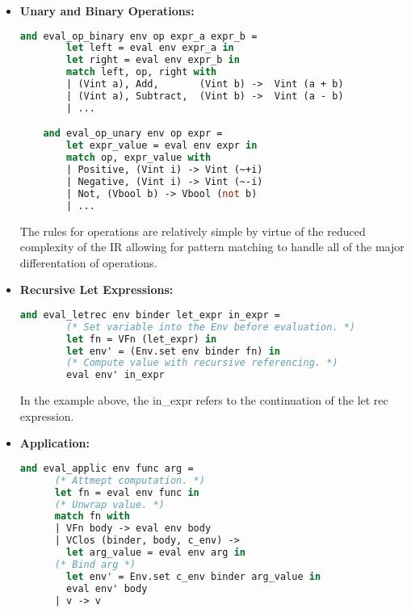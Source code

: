 \documentclass{l4proj}
\begin{document}
\begin{itemize}
    \item \textbf{Unary and Binary Operations:}
    
    \begin{lstlisting}[language=Caml, caption=Excerpt of the PyFunc Interpreter rules for binary and unary operations.]
    and eval_op_binary env op expr_a expr_b =
        let left = eval env expr_a in
        let right = eval env expr_b in
        match left, op, right with
        | (Vint a), Add,       (Vint b) ->  Vint (a + b)
        | (Vint a), Subtract,  (Vint b) ->  Vint (a - b)
        | ...

    and eval_op_unary env op expr = 
        let expr_value = eval env expr in
        match op, expr_value with
        | Positive, (Vint i) -> Vint (~+i)
        | Negative, (Vint i) -> Vint (~-i)
        | Not, (Vbool b) -> Vbool (not b)
        | ...
    \end{lstlisting}
    The rules for operations are relatively simple by virtue of the reduced complexity of the IR allowing for pattern matching to handle all of the major differentation of operations.

    \item \textbf{Recursive Let Expressions:}
    \begin{lstlisting}[language=Caml, caption=The Pyfunc Interpreter let rec rule.]
    and eval_letrec env binder let_expr in_expr =
        (* Set variable into the Env before evaluation. *)
        let fn = VFn (let_expr) in
        let env' = (Env.set env binder fn) in
        (* Compute value with recursive referencing. *)
        eval env' in_expr
    \end{lstlisting}

    In the example above, the in\_expr refers to the continuation of the let rec expression.    

    \item \textbf{Application:}
    \begin{lstlisting}[language=Caml, caption=The PyFunc interpreter's application rule.]
    and eval_applic env func arg =
      (* Attmept computation. *)
      let fn = eval env func in
      (* Unwrap value. *)
      match fn with 
      | VFn body -> eval env body
      | VClos (binder, body, c_env) -> 
        let arg_value = eval env arg in
      (* Bind arg *)
        let env' = Env.set c_env binder arg_value in
        eval env' body 
      | v -> v
    \end{lstlisting}


\end{itemize}
\end{document}

